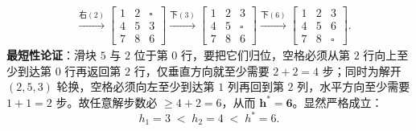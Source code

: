 \begin{enumerate}[label=(\arabic*), leftmargin=1.8em]
\begin{align*}
    &\xrightarrow{\text{右}(2)}
    \begin{bmatrix}1&2&\square\\4&5&3\\7&8&6\end{bmatrix}
    \xrightarrow{\text{下}(3)}
    \begin{bmatrix}1&2&3\\4&5&\square\\7&8&6\end{bmatrix}
    \xrightarrow{\text{下}(6)}
    \begin{bmatrix}1&2&3\\4&5&6\\7&8&\square\end{bmatrix}.
  \end{align*}
  \textbf{最短性论证}：滑块 $5$ 与 $2$ 位于第 $0$ 行，要把它们归位，空格必须从第 $2$ 行向上至少到达第 $0$ 行再返回第 $2$ 行，仅垂直方向就至少需要 $2 + 2 = 4$ 步；同时为解开 $(2,5,3)$ 轮换，空格必须向左至少到达第 $1$ 列再回到第 $2$ 列，水平方向至少需要 $1 + 1 = 2$ 步。故任意解步数必 $\ge 4 + 2 = 6$，从而 $\mathbf{h^* = 6}$。显然严格成立：
  \[
    h_1 = 3 \;<\; h_2 = 4 \;<\; h^* = 6.
  \]
\end{enumerate}

